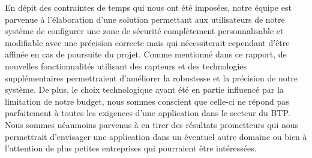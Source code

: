 En dépit des contraintes de temps qui nous ont été imposées, notre équipe est parvenue à l'élaboration d'une solution permettant aux utilisateurs de notre système de configurer une zone de sécurité complètement personnalisable et modifiable avec une précision correcte mais qui nécessiterait cependant d’être affinée en cas de poursuite du projet. Comme mentionné dans ce rapport, de nouvelles fonctionnalités utilisant des capteurs et des technologies supplémentaires permettraient d’améliorer la robustesse et la précision de notre système. De plus, le choix technologique ayant été en partie influencé par la limitation de notre budget, nous sommes conscient que celle-ci ne répond pas parfaitement à toutes les exigences d’une application dans le secteur du BTP. Nous sommes néanmoins parvenus à en tirer des résultats prometteurs qui nous permettrait d’envisager une application dans un éventuel autre domaine ou bien à l’attention de plus petites entreprises qui pourraient être intéressées.